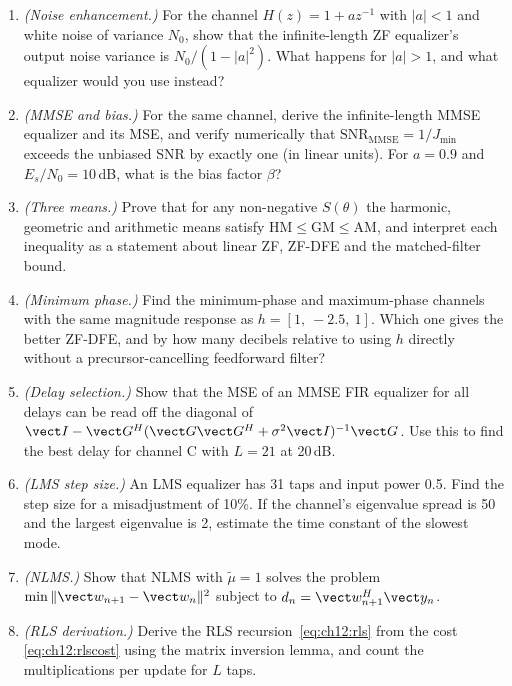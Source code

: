 \problems
\begin{enumerate}[label=\thechapter.\arabic*]
\item \emph{(Noise enhancement.)} For the channel $H(z)=1+az^{-1}$ with $|a|<1$ and white noise of
variance $N_0$, show that the infinite-length ZF equalizer's output noise variance is
$N_0/(1-|a|^2)$. What happens for $|a|>1$, and what equalizer would you use instead?

\item \emph{(MMSE and bias.)} For the same channel, derive the infinite-length MMSE equalizer and its
MSE, and verify numerically that $\mathrm{SNR}_{\mathrm{MMSE}}=1/J_{\min}$ exceeds the unbiased SNR by
exactly one (in linear units). For $a=0.9$ and $E_s/N_0=10$\,dB, what is the bias factor $\beta$?

\item \emph{(Three means.)} Prove that for any non-negative $S(\theta)$ the harmonic, geometric and
arithmetic means satisfy $\mathrm{HM}\le\mathrm{GM}\le\mathrm{AM}$, and interpret each inequality as
a statement about linear ZF, ZF-DFE and the matched-filter bound.

\item \emph{(Minimum phase.)} Find the minimum-phase and maximum-phase channels with the same magnitude
response as $h=[1,\ -2.5,\ 1]$. Which one gives the better ZF-DFE, and by how many decibels relative to
using $h$ directly without a precursor-cancelling feedforward filter?

\item \emph{(Delay selection.)} Show that the MSE of an MMSE FIR equalizer for all delays can be read
off the diagonal of $\vect I-\vect G^H(\vect G\vect G^H+\sigma^2\vect I)^{-1}\vect G$. Use this to find the
best delay for channel C with $L=21$ at 20\,dB.

\item \emph{(LMS step size.)} An LMS equalizer has 31 taps and input power 0.5. Find the step size for
a misadjustment of 10\%. If the channel's eigenvalue spread is 50 and the largest eigenvalue is 2,
estimate the time constant of the slowest mode.

\item \emph{(NLMS.)} Show that NLMS with $\tilde\mu=1$ solves the problem
$\min\|\vect w_{n+1}-\vect w_n\|^2$ subject to $d_n=\vect w_{n+1}^H\vect y_n$.

\item \emph{(RLS derivation.)} Derive the RLS recursion~\eqref{eq:ch12:rls} from the cost
\eqref{eq:ch12:rlscost} using the matrix inversion lemma, and count the multiplications per update for
$L$ taps.


\end{enumerate}
